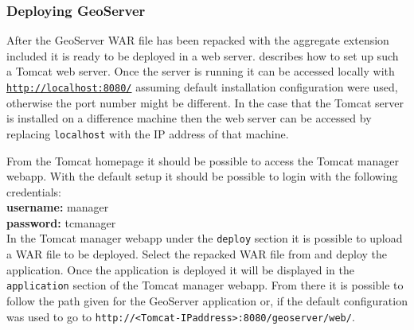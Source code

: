 \subsubsection{Deploying GeoServer}
\label{sec:geotomcat}
After the GeoServer WAR file has been repacked with the aggregate extension included it is ready to be deployed in a web server.  describes how to set up such a Tomcat web server. Once the server is running it can be accessed locally with \href{http://localhost:8080/}{\lstinline|http://localhost:8080/|} assuming default installation configuration were used, otherwise the port number might be different. In the case that the Tomcat server is installed on a difference machine then the web server can be accessed by replacing \lstinline|localhost| with the IP address of that machine.

From the Tomcat homepage it should be possible to access the Tomcat manager webapp. With the default setup it should be possible to login with the following credentials:\\
\indent \textbf{username:} manager \\
\indent \textbf{password:} tcmanager \\
In the Tomcat manager webapp under the \lstinline|deploy| section it is possible to upload a WAR file to be deployed. Select the repacked WAR file from  and deploy the application. Once the application is deployed it will be displayed in the \lstinline|application| section of the Tomcat manager webapp. From there it is possible to follow the path given for the GeoServer application or, if the default configuration was used to go to \mbox{\lstinline|http://<Tomcat-IPaddress>:8080/geoserver/web/|}.